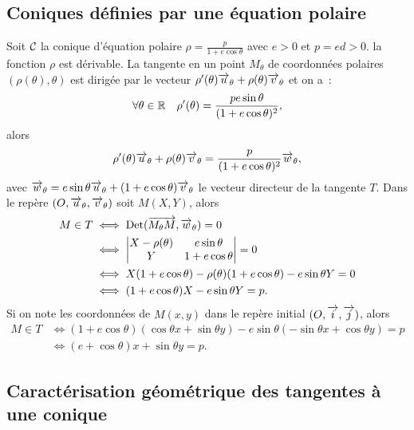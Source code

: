 \subsection{Coniques définies par une équation polaire}

Soit $\mathcal{C}_{{}}$ la conique d'équation polaire $\rho=\frac{p}{1+e\cos \theta}$ avec $e>0$ et $p=ed>0$. la fonction $\rho$ est dérivable. La tangente en un point $M_{\theta}$ de coordonnées polaires $(\rho(\theta),\theta)$ est dirigée par le vecteur $\rho'(\theta) \overrightarrow{u}_\theta + \rho(\theta) \overrightarrow{v}_\theta$ et on a~:
\begin{equation}
  \forall \theta \in \mathbb{R} \quad \rho'(\theta)=\frac{pe\sin\theta}{(1+e\cos\theta)^2},
\end{equation}
alors
\begin{equation}
  \rho'(\theta) \overrightarrow{u}_\theta + \rho(\theta) \overrightarrow{v}_\theta = \frac{p}{(1+e\cos\theta)^2} \overrightarrow{w}_\theta,
\end{equation}
avec $\overrightarrow{w}_\theta = e\sin\theta\overrightarrow{u}_\theta + (1+e\cos\theta)\overrightarrow{v}_\theta$ le vecteur directeur de la tangente $T$. Dans le repère $(O,\overrightarrow{u}_\theta, \overrightarrow{v}_\theta)$ soit $M(X,Y)$, alors
\begin{align}
  M \in T & \iff  \operatorname{Det}(\overrightarrow{M_\theta M},\overrightarrow{w}_\theta)=0 \\
  & \iff \begin{vmatrix} X-\rho(\theta) & e\sin\theta \\ Y & 1+e\cos\theta \end{vmatrix} = 0 \\
  & \iff X(1+e\cos\theta)-\rho(\theta)(1+e\cos\theta)-e\sin\theta Y = 0\\
  & \iff (1+e\cos\theta)X-e\sin\theta Y=p.
\end{align}
Si on note les coordonnées de $M(x,y)$ dans le repère initial $(O,\overrightarrow{i},\overrightarrow{j})$, alors
\begin{align}
  M \in T &\iff (1+e\cos\theta)(\cos\theta x+\sin\theta y)-e\sin\theta(-\sin\theta x+\cos\theta y)=p\\
&\iff (e+\cos\theta)x+\sin\theta y=p.
\end{align}

\subsection{Caractérisation géométrique des tangentes à une conique}
